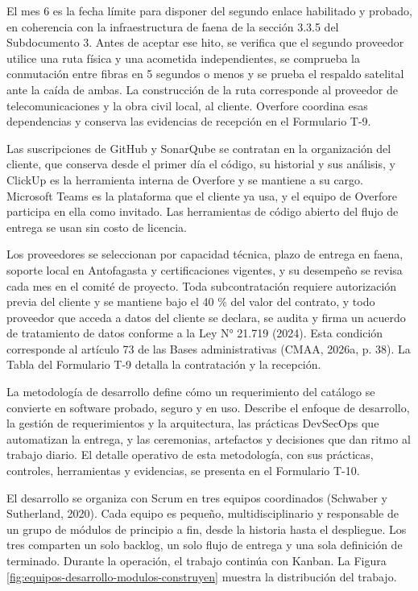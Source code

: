 \documentclass[subdoc]{../../comun/overfore}
\begin{document}
El mes 6 es la fecha límite para disponer del segundo enlace habilitado y probado, en coherencia con la infraestructura de faena de la sección 3.3.5 del Subdocumento 3. Antes de aceptar ese hito, se verifica que el segundo proveedor utilice una ruta física y una acometida independientes, se comprueba la conmutación entre fibras en 5 segundos o menos y se prueba el respaldo satelital ante la caída de ambas. La construcción de la ruta corresponde al proveedor de telecomunicaciones y la obra civil local, al cliente. Overfore coordina esas dependencias y conserva las evidencias de recepción en el Formulario T-9.

Las suscripciones de GitHub y SonarQube se contratan en la organización del cliente, que conserva desde el primer día el código, su historial y sus análisis, y ClickUp es la herramienta interna de Overfore y se mantiene a su cargo. Microsoft Teams es la plataforma que el cliente ya usa, y el equipo de Overfore participa en ella como invitado. Las herramientas de código abierto del flujo de entrega se usan sin costo de licencia.

Los proveedores se seleccionan por capacidad técnica, plazo de entrega en faena, soporte local en Antofagasta y certificaciones vigentes, y su desempeño se revisa cada mes en el comité de proyecto. Toda subcontratación requiere autorización previa del cliente y se mantiene bajo el 40 \% del valor del contrato, y todo proveedor que acceda a datos del cliente se declara, se audita y firma un acuerdo de tratamiento de datos conforme a la Ley N° 21.719 (2024). Esta condición corresponde al artículo 73 de las Bases administrativas (CMAA, 2026a, p. 38). La Tabla  del Formulario T-9 detalla la contratación y la recepción.

La metodología de desarrollo define cómo un requerimiento del catálogo se convierte en software probado, seguro y en uso. Describe el enfoque de desarrollo, la gestión de requerimientos y la arquitectura, las prácticas DevSecOps que automatizan la entrega, y las ceremonias, artefactos y decisiones que dan ritmo al trabajo diario. El detalle operativo de esta metodología, con sus prácticas, controles, herramientas y evidencias, se presenta en el Formulario T-10.

El desarrollo se organiza con Scrum en tres equipos coordinados (Schwaber y Sutherland, 2020). Cada equipo es pequeño, multidisciplinario y responsable de un grupo de módulos de principio a fin, desde la historia hasta el despliegue. Los tres comparten un solo backlog, un solo flujo de entrega y una sola definición de terminado. Durante la operación, el trabajo continúa con Kanban. La Figura \ref{fig:equipos-desarrollo-modulos-construyen} muestra la distribución del trabajo.
\end{document}
